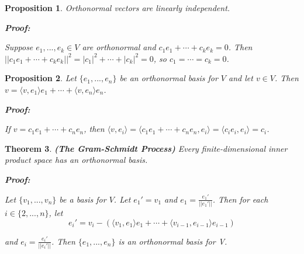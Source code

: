 \documentclass{article}
\theoremstyle{colontheorem}
\newtheorem{theorem}{Theorem}[section]
\newtheorem{proposition}[theorem]{Proposition}
\newenvironment{Theorem}
{
	\begin{mdframed}[backgroundcolor=TheoremOrange!10]
	\begin{theorem}
}
{
	\end{theorem}
	\end{mdframed}
	
	\vspace{.15in}
}
\newenvironment{Proposition}
{
	\begin{mdframed}[backgroundcolor=PropPink!10]
	\begin{proposition}
}
{
	\end{proposition}
	\end{mdframed}
	
	\vspace{.15in}
}
\newenvironment{Proof}
{
	\begin{mdframed}[backgroundcolor=ProofPurple!10]
	\textbf{Proof:}%
}
{
	\end{mdframed}
	
	\vspace{.085in}
}
\begin{document}
\begin{Proposition}
	
	Orthonormal vectors are linearly independent.
	
	\begin{Proof}
		Suppose $e_1, ..., e_k \in V$ are orthonormal and $c_1 e_1 + \cdots + c_k e_k = 0$. Then $||c_1 e_1 + \cdots + c_k e_k||^2 = |c_1|^2 + \cdots + |c_k|^2 = 0$, so $c_1 = \cdots = c_k = 0$.
		
	\end{Proof}
	
\end{Proposition}



\begin{Proposition}
	
	Let $\{e_1, ..., e_n\}$ be an orthonormal basis for $V$ and let $v \in V$. Then $v = \langle v, e_1 \rangle e_1 + \cdots + \langle v, e_n \rangle e_n$.
	
	\begin{Proof}
		If $v = c_1 e_1 + \cdots + c_n e_n$, then $\langle v, e_i \rangle = \langle c_1 e_1 + \cdots + c_n e_n, e_i \rangle = \langle c_i e_i, e_i \rangle = c_i$.
		
	\end{Proof}
	
\end{Proposition}



\begin{Theorem}
	
	\textbf{(The Gram-Schmidt Process)} Every finite-dimensional inner product space has an orthonormal basis.
	
	\begin{Proof}
		Let $\{v_1, ..., v_n\}$ be a basis for $V$. Let $e_1' = v_1$ and $e_1 = \frac{e_1'}{||e_1'||}$. Then for each $i \in \{2, ..., n\}$, let
		$$
		e_i' = v_i - \left( \langle v_1, e_1 \rangle e_1 + \cdots + \langle v_{i-1}, e_{i-1} \rangle e_{i-1} \right)
		$$ 
		
		and $e_i = \frac{e_i'}{||e_i'||}$. Then $\{e_1, ..., e_n\}$ is an orthonormal basis for V.
		
	\end{Proof}
	
\end{Theorem}
\end{document}
